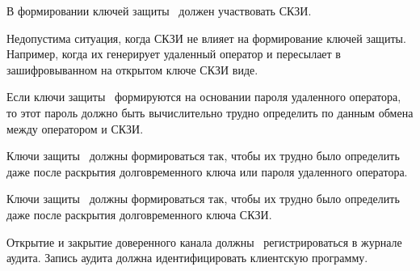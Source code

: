\label{R.TC.Keys}
В формировании ключей защиты~ должен участвовать СКЗИ.

\begin{note}
Недопустима ситуация, когда СКЗИ не влияет на формирование ключей защиты.
Например, когда их генерирует удаленный оператор и пересылает 
в зашифровыванном на открытом ключе СКЗИ виде.
\end{note}

\label{R.TC.Pwd}
Если ключи защиты~ формируются на основании пароля
удаленного оператора, то этот пароль должно быть вычислительно
трудно определить по данным обмена между оператором и СКЗИ.

\label{R.TC.FSWeak}
Ключи защиты~ должны формироваться так, чтобы их трудно
было определить даже после раскрытия долговременного ключа или пароля удаленного 
оператора.

\label{R.TC.FS}
Ключи защиты~ должны формироваться так, 
чтобы их трудно было определить даже после раскрытия долговременного ключа 
СКЗИ.

\label{R.TC.AU}
Открытие и закрытие доверенного канала должны~ 
регистрироваться в журнале аудита. Запись аудита должна идентифицировать 
клиентскую программу.



